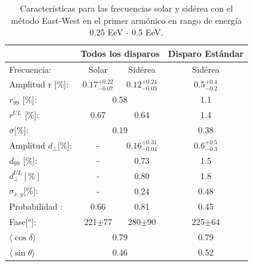 \begin{table}[H]
    \begin{small}
        \begin{center}
            \begin{tabular}[c]{l|c|c||c|}
\cline{2-4}                                       & \multicolumn{2}{c||}{Todos los disparos}    & \multicolumn{1}{c|}{Disparo Estándar}   \\ \hline
\multicolumn{1}{|l|}{Frecuencia:                } & Solar	                & Sidérea	                & Sidérea \cite{Aab_2020}   \\ \hline
\multicolumn{1}{|l|}{Amplitud r [\%]:           } & $0.17^{+0.22}_{-0.07}$	& $0.12^{+0.24}_{-0.03}$ 	& $0.5^{+0.4}_{-0.2}$ \cite{codigo}      \\
\multicolumn{1}{|l|}{$r_{99}$ [\%]:             } & \multicolumn{2}{c||}{0.58}                          & 1.1\cite{codigo}                 \\
\multicolumn{1}{|l|}{$r^{UL}$ [\%]:             } & 0.67 	                & 0.64                      & 1.4\cite{codigo}                 \\ 
\multicolumn{1}{|l|}{$\sigma$[\%]:              } & \multicolumn{2}{c||}{0.19}                          & 0.38\cite{codigo}       \\\hline
\multicolumn{1}{|l|}{Amplitud $d_\perp$[\%]:    } & -	                    & $0.16^{+0.31}_{-0.04}$ 	& $0.6^{+0.5}_{-0.3}$       \\
\multicolumn{1}{|l|}{$d_{99}$ [\%]:             } & - 	                    & 0.73                      & 1.5  \cite{codigo}                \\
\multicolumn{1}{|l|}{$d_{\perp}^{UL}[\%]$       } & -                       & 0.80                      & 1.8                         \\
\multicolumn{1}{|l|}{$\sigma_{x,y}$[\%]:        } & -	                    & 0.24	                    & 0.48       \\\hline
\multicolumn{1}{|l|}{Probabilidad      :        } & 0.66                    & 0.81	                    & 0.45       \\
\multicolumn{1}{|l|}{Fase[$^o$]:                } & 221$\pm$77              & 280$\pm$90                & 225$\pm$64\\ \hline
\multicolumn{1}{|l|}{$\langle\cos\delta \rangle$} & \multicolumn{2}{c||}{0.79}        	                & 0.79 \cite{codigo}        \\        
\multicolumn{1}{|l|}{$\langle\sin\theta \rangle$} & \multicolumn{2}{c||}{0.46}        	                & 0.52 \cite{codigo}        \\ \hline       
            \end{tabular}
            
        \end{center}
    \end{small}
    \caption{Características para las frecuencias solar y sidérea con el método East-West en el primer armónico en rango de energía 0.25 EeV - 0.5 EeV.}
    \label{tab:primer_bin_data}
\end{table}

